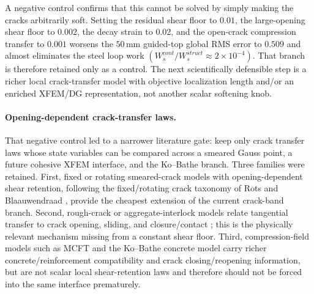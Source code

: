 A negative control confirms that this cannot be solved by simply making the
cracks arbitrarily soft.  Setting the residual shear floor to \(0.01\), the
large-opening shear floor to \(0.002\), the decay strain to \(0.02\), and the
open-crack compression transfer to \(0.001\) worsens the \(50\,\mathrm{mm}\)
guided-top global RMS error to \(0.509\) and almost eliminates the steel loop
work \((W_s^{cont}/W_s^{struct}\approx2\times10^{-4})\).  That branch is
therefore retained only as a control.  The next scientifically defensible step
is a richer local crack-transfer model with objective localization length
and/or an enriched XFEM/DG representation, not another scalar softening knob.

\paragraph{Opening-dependent crack-transfer laws.}
That negative control led to a narrower literature gate: keep only crack
transfer laws whose state variables can be compared across a smeared Gauss
point, a future cohesive XFEM interface, and the Ko--Bathe branch. Three
families were retained. First, fixed or rotating smeared-crack models with
opening-dependent shear retention, following the fixed/rotating crack taxonomy
of Rots and Blaauwendraad \cite{RotsBlaauwendraad1989CrackModels}, provide the
cheapest extension of the current crack-band branch. Second, rough-crack or
aggregate-interlock models relate tangential transfer to crack opening,
sliding, and closure/contact \cite{BazantGambarova1980RoughCracks,
Walraven1981AggregateInterlock}; this is the physically relevant mechanism
missing from a constant shear floor. Third, compression-field models such as
MCFT \cite{VecchioCollins1986MCFT} and the Ko--Bathe concrete model
\cite{KoBathe2026} carry richer concrete/reinforcement compatibility and
crack closing/reopening information, but are not scalar local shear-retention
laws and therefore should not be forced into the same interface prematurely.

